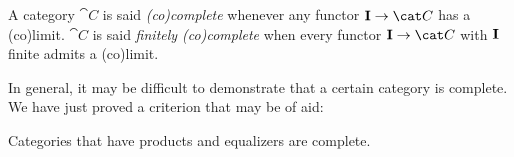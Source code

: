 \begin{definition}
  A category \(\cat C\) is said {\em (co)complete} whenever any
  functor \({\bf I} \to \cat C\) has a (co)limit. \(\cat C\) is said
  {\em finitely (co)complete} when every functor
  \({\bf I} \to \cat C\) with \({\bf I}\) finite admits a (co)limit.
\end{definition}

 In general, it may be difficult to demonstrate that a
certain category is complete. We have just proved a criterion that may
be of aid:

\begin{proposition}\label{proposition:Completeness}
  Categories that have products and equalizers are complete.
\end{proposition}

